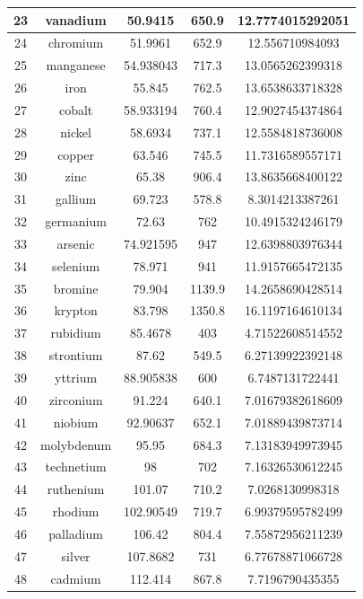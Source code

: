 \documentclass[a4paper]{article}
\begin{document}
\begin{center}
\begin{tabular}{|c|c|c|c|c|}
		\hline
		23 & vanadium & 50.9415 & 650.9 & 12.7774015292051 \\
		\hline
		24 & chromium & 51.9961 & 652.9 & 12.556710984093 \\
		\hline
		25 & manganese & 54.938043 & 717.3 & 13.0565262399318 \\
		\hline
		26 & iron & 55.845 & 762.5 & 13.6538633718328 \\
		\hline
		27 & cobalt & 58.933194 & 760.4 & 12.9027454374864 \\
		\hline
		28 & nickel & 58.6934 & 737.1 & 12.5584818736008 \\
		\hline
		29 & copper & 63.546 & 745.5 & 11.7316589557171 \\
		\hline
		30 & zinc & 65.38 & 906.4 & 13.8635668400122 \\
		\hline
		31 & gallium & 69.723 & 578.8 & 8.3014213387261 \\
		\hline
		32 & germanium & 72.63 & 762 & 10.4915324246179 \\
		\hline
		33 & arsenic & 74.921595 & 947 & 12.6398803976344 \\
		\hline
		34 & selenium & 78.971 & 941 & 11.9157665472135 \\
		\hline
		35 & bromine & 79.904 & 1139.9 & 14.2658690428514 \\
		\hline
		36 & krypton & 83.798 & 1350.8 & 16.1197164610134 \\
		\hline
		37 & rubidium & 85.4678 & 403 & 4.71522608514552 \\
		\hline
		38 & strontium & 87.62 & 549.5 & 6.27139922392148 \\
		\hline
		39 & yttrium & 88.905838 & 600 & 6.7487131722441 \\
		\hline
		40 & zirconium & 91.224 & 640.1 & 7.01679382618609 \\
		\hline
		41 & niobium & 92.90637 & 652.1 & 7.01889439873714 \\
		\hline
		42 & molybdenum & 95.95 & 684.3 & 7.13183949973945 \\
		\hline
		43 & technetium & 98 & 702 & 7.16326530612245 \\
		\hline
		44 & ruthenium & 101.07 & 710.2 & 7.0268130998318 \\
		\hline
		45 & rhodium & 102.90549 & 719.7 & 6.99379595782499 \\
		\hline
		46 & palladium & 106.42 & 804.4 & 7.55872956211239 \\
		\hline
		47 & silver & 107.8682 & 731 & 6.77678871066728 \\
		\hline
		48 & cadmium & 112.414 & 867.8 & 7.7196790435355 \\

\end{tabular}
\end{center}
\end{document}
